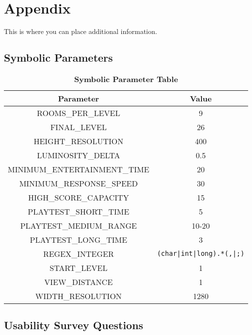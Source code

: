 \documentclass[12pt, titlepage]{article}
\begin{document}
\newpage





\newpage
\section{Appendix}
\label{section7}

	This is where you can place additional information.

	\subsection{Symbolic Parameters}

		\begin{table}[h!]
			\centering
			\caption{\textbf{Symbolic Parameter Table}}
			\label{symbolicParameters}
			\bigskip
			\def\arraystretch{1.6}


			\begin{tabular}{| c | c |}
				\bottomrule
				\textbf{Parameter} & \textbf{Value} \\
				\hline
				ROOMS\_PER\_LEVEL & 9 \\
				FINAL\_LEVEL & 26 \\
				HEIGHT\_RESOLUTION & 400 \\
				LUMINOSITY\_DELTA & 0.5 \\
				MINIMUM\_ENTERTAINMENT\_TIME & 20 \\
				MINIMUM\_RESPONSE\_SPEED & 30 \\
				HIGH\_SCORE\_CAPACITY & 15 \\
				PLAYTEST\_SHORT\_TIME & 5 \\
				PLAYTEST\_MEDIUM\_RANGE & 10-20 \\
				PLAYTEST\_LONG\_TIME & 3 \\
				REGEX\_INTEGER & \lstinline$(char|int|long).*(,|;)$ \\
				START\_LEVEL & 1 \\
				VIEW\_DISTANCE & 1 \\
				WIDTH\_RESOLUTION & 1280 \\
				\toprule
			\end{tabular}
		\end{table}

\newpage
\subsection{Usability Survey Questions}
\end{document}
